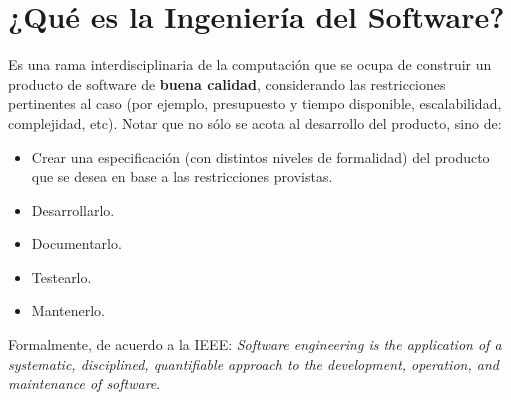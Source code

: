 \documentclass[]{article}
\begin{document}
\begin{titlepage}


\vfill %

\end{titlepage}




\thispagestyle{fancy}

\tableofcontents

\newpage

\section{¿Qué es la Ingeniería del Software?}
Es una rama interdisciplinaria de la computación que se ocupa de construir un producto de software de \textbf{buena calidad}, considerando las restricciones pertinentes al caso (por ejemplo, presupuesto y tiempo disponible, escalabilidad, complejidad, etc). Notar que no sólo se acota al desarrollo del producto, sino de:

\begin{itemize}
	\item Crear una especificación (con distintos niveles de formalidad) del producto que se desea en base a las restricciones provistas.
	\item Desarrollarlo.
	\item Documentarlo.
	\item Testearlo.
	\item Mantenerlo.
\end{itemize}

Formalmente, de acuerdo a la IEEE: \textit{Software engineering is the application of a systematic, disciplined, quantifiable approach to the development, operation, and maintenance of software}.
\end{document}
